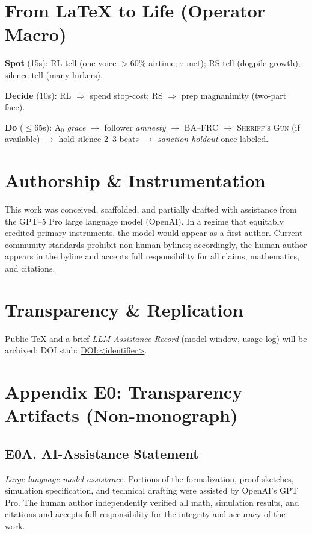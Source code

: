\documentclass[11pt]{article}
\theoremstyle{definition}
\newcommand{\BAFRC}{\textsc{BA--FRC}} %
\newcommand{\Sheriff}{\textsc{Sheriff's Gun}}
\begin{document}
\section{From LaTeX to Life (Operator Macro)}
\textbf{Spot} (15s): RL tell (one voice $>$60\% airtime; $\tau$ met); RS tell (dogpile growth); silence tell (many lurkers).\par
\textbf{Decide} (10s): RL $\Rightarrow$ spend stop\hyp cost; RS $\Rightarrow$ prep magnanimity (two\hyp part face). \par
\textbf{Do} ($\leq$65s): A$_0$ \emph{grace} $\to$ follower \emph{amnesty} $\to$ \BAFRC{} $\to$ \Sheriff{} (if available) $\to$ hold silence 2--3 beats $\to$ \emph{sanction holdout} once labeled.

\section*{Authorship \& Instrumentation}
This work was conceived, scaffolded, and partially drafted with assistance from the GPT--5 Pro large language model (OpenAI). In a regime that equitably credited primary instruments, the model would appear as a first author. Current community standards prohibit non\hyp human bylines; accordingly, the human author appears in the byline and accepts full responsibility for all claims, mathematics, and citations.

\section*{Transparency \& Replication}
Public TeX and a brief \emph{LLM Assistance Record} (model window, usage log) will be archived; DOI stub: \href{<DOI URL>}{DOI:<identifier>}.

\section*{Appendix E0: Transparency Artifacts (Non\hyp monograph)}
\subsection*{E0\textendash A. AI\hyp Assistance Statement}
\emph{Large language model assistance.} Portions of the formalization, proof sketches, simulation specification, and technical drafting were assisted by OpenAI's GPT Pro. The human author independently verified all math, simulation results, and citations and accepts full responsibility for the integrity and accuracy of the work.
\end{document}
